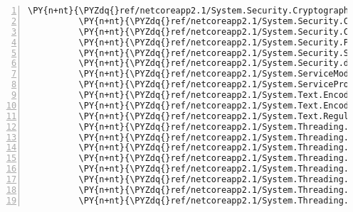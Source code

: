 \begin{Verbatim}[commandchars=\\\{\},numbers=left,firstnumber=1,stepnumber=1,numberblanklines=0]
          \PY{n+nt}{\PYZdq{}ref/netcoreapp2.1/System.Security.Cryptography.Encoding.dll\PYZdq{}}\PY{p}{:} \PY{p}{\PYZob{}}\PY{p}{\PYZcb{}}\PY{p}{,}
          \PY{n+nt}{\PYZdq{}ref/netcoreapp2.1/System.Security.Cryptography.Primitives.dll\PYZdq{}}\PY{p}{:} \PY{p}{\PYZob{}}\PY{p}{\PYZcb{}}\PY{p}{,}
          \PY{n+nt}{\PYZdq{}ref/netcoreapp2.1/System.Security.Cryptography.X509Certificates.dll\PYZdq{}}\PY{p}{:} \PY{p}{\PYZob{}}\PY{p}{\PYZcb{}}\PY{p}{,}
          \PY{n+nt}{\PYZdq{}ref/netcoreapp2.1/System.Security.Principal.dll\PYZdq{}}\PY{p}{:} \PY{p}{\PYZob{}}\PY{p}{\PYZcb{}}\PY{p}{,}
          \PY{n+nt}{\PYZdq{}ref/netcoreapp2.1/System.Security.SecureString.dll\PYZdq{}}\PY{p}{:} \PY{p}{\PYZob{}}\PY{p}{\PYZcb{}}\PY{p}{,}
          \PY{n+nt}{\PYZdq{}ref/netcoreapp2.1/System.Security.dll\PYZdq{}}\PY{p}{:} \PY{p}{\PYZob{}}\PY{p}{\PYZcb{}}\PY{p}{,}
          \PY{n+nt}{\PYZdq{}ref/netcoreapp2.1/System.ServiceModel.Web.dll\PYZdq{}}\PY{p}{:} \PY{p}{\PYZob{}}\PY{p}{\PYZcb{}}\PY{p}{,}
          \PY{n+nt}{\PYZdq{}ref/netcoreapp2.1/System.ServiceProcess.dll\PYZdq{}}\PY{p}{:} \PY{p}{\PYZob{}}\PY{p}{\PYZcb{}}\PY{p}{,}
          \PY{n+nt}{\PYZdq{}ref/netcoreapp2.1/System.Text.Encoding.Extensions.dll\PYZdq{}}\PY{p}{:} \PY{p}{\PYZob{}}\PY{p}{\PYZcb{}}\PY{p}{,}
          \PY{n+nt}{\PYZdq{}ref/netcoreapp2.1/System.Text.Encoding.dll\PYZdq{}}\PY{p}{:} \PY{p}{\PYZob{}}\PY{p}{\PYZcb{}}\PY{p}{,}
          \PY{n+nt}{\PYZdq{}ref/netcoreapp2.1/System.Text.RegularExpressions.dll\PYZdq{}}\PY{p}{:} \PY{p}{\PYZob{}}\PY{p}{\PYZcb{}}\PY{p}{,}
          \PY{n+nt}{\PYZdq{}ref/netcoreapp2.1/System.Threading.Overlapped.dll\PYZdq{}}\PY{p}{:} \PY{p}{\PYZob{}}\PY{p}{\PYZcb{}}\PY{p}{,}
          \PY{n+nt}{\PYZdq{}ref/netcoreapp2.1/System.Threading.Tasks.Dataflow.dll\PYZdq{}}\PY{p}{:} \PY{p}{\PYZob{}}\PY{p}{\PYZcb{}}\PY{p}{,}
          \PY{n+nt}{\PYZdq{}ref/netcoreapp2.1/System.Threading.Tasks.Extensions.dll\PYZdq{}}\PY{p}{:} \PY{p}{\PYZob{}}\PY{p}{\PYZcb{}}\PY{p}{,}
          \PY{n+nt}{\PYZdq{}ref/netcoreapp2.1/System.Threading.Tasks.Parallel.dll\PYZdq{}}\PY{p}{:} \PY{p}{\PYZob{}}\PY{p}{\PYZcb{}}\PY{p}{,}
          \PY{n+nt}{\PYZdq{}ref/netcoreapp2.1/System.Threading.Tasks.dll\PYZdq{}}\PY{p}{:} \PY{p}{\PYZob{}}\PY{p}{\PYZcb{}}\PY{p}{,}
          \PY{n+nt}{\PYZdq{}ref/netcoreapp2.1/System.Threading.Thread.dll\PYZdq{}}\PY{p}{:} \PY{p}{\PYZob{}}\PY{p}{\PYZcb{}}\PY{p}{,}
          \PY{n+nt}{\PYZdq{}ref/netcoreapp2.1/System.Threading.ThreadPool.dll\PYZdq{}}\PY{p}{:} \PY{p}{\PYZob{}}\PY{p}{\PYZcb{}}\PY{p}{,}
          \PY{n+nt}{\PYZdq{}ref/netcoreapp2.1/System.Threading.Timer.dll\PYZdq{}}\PY{p}{:} \PY{p}{\PYZob{}}\PY{p}{\PYZcb{}}\PY{p}{,}

\end{Verbatim}
